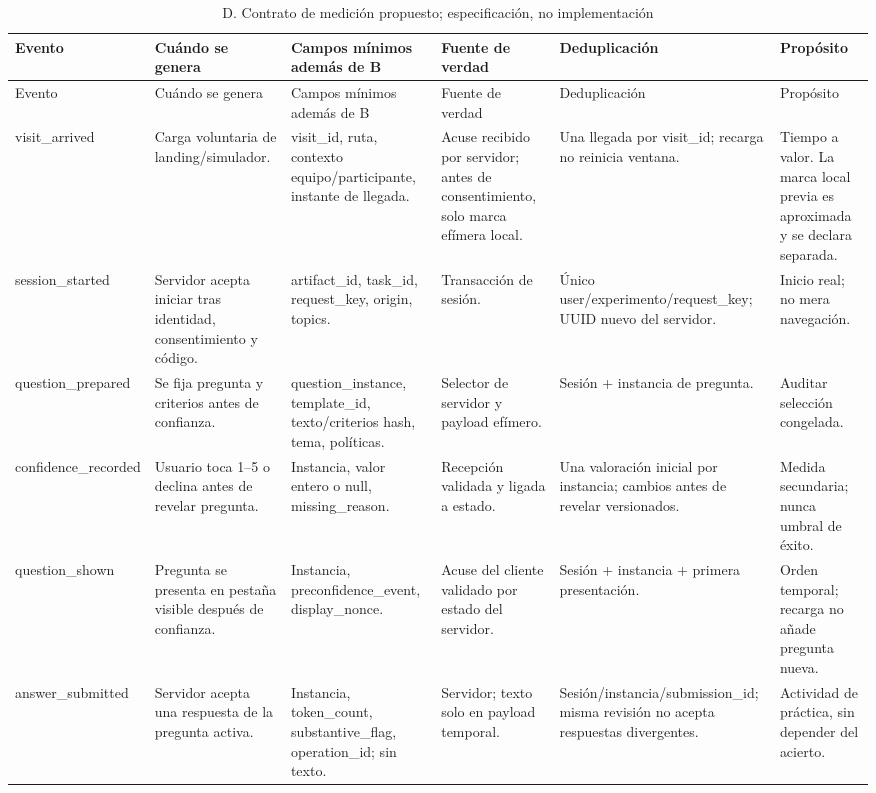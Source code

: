 \documentclass[11pt,a4paper]{report}
\begin{document}
\begin{landscape}
\small
\begin{longtable}{P{3.4cm}P{4.2cm}P{4.3cm}P{3.7cm}P{4.6cm}P{3.2cm}}
\caption{D. Contrato de medición propuesto; especificación, no implementación}\label{tab:eventos}\\
\toprule Evento & Cuándo se genera & Campos mínimos además de B & Fuente de verdad & Deduplicación & Propósito \\\midrule\endfirsthead
\toprule Evento & Cuándo se genera & Campos mínimos además de B & Fuente de verdad & Deduplicación & Propósito \\\midrule\endhead
visit\_arrived & Carga voluntaria de landing/simulador. & visit\_id, ruta, contexto equipo/participante, instante de llegada. & Acuse recibido por servidor; antes de consentimiento, solo marca efímera local. & Una llegada por visit\_id; recarga no reinicia ventana. & Tiempo a valor. La marca local previa es aproximada y se declara separada.\\
session\_started & Servidor acepta iniciar tras identidad, consentimiento y código. & artifact\_id, task\_id, request\_key, origin, topics. & Transacción de sesión. & Único user/experimento/request\_key; UUID nuevo del servidor. & Inicio real; no mera navegación.\\
question\_prepared & Se fija pregunta y criterios antes de confianza. & question\_instance, template\_id, texto/criterios hash, tema, políticas. & Selector de servidor y payload efímero. & Sesión + instancia de pregunta. & Auditar selección congelada.\\
confidence\_recorded & Usuario toca 1--5 o declina antes de revelar pregunta. & Instancia, valor entero o null, missing\_reason. & Recepción validada y ligada a estado. & Una valoración inicial por instancia; cambios antes de revelar versionados. & Medida secundaria; nunca umbral de éxito.\\
question\_shown & Pregunta se presenta en pestaña visible después de confianza. & Instancia, preconfidence\_event, display\_nonce. & Acuse del cliente validado por estado del servidor. & Sesión + instancia + primera presentación. & Orden temporal; recarga no añade pregunta nueva.\\
answer\_submitted & Servidor acepta una respuesta de la pregunta activa. & Instancia, token\_count, substantive\_flag, operation\_id; sin texto. & Servidor; texto solo en payload temporal. & Sesión/instancia/submission\_id; misma revisión no acepta respuestas divergentes. & Actividad de práctica, sin depender del acierto.\\

\end{longtable}
\end{landscape}
\end{document}
